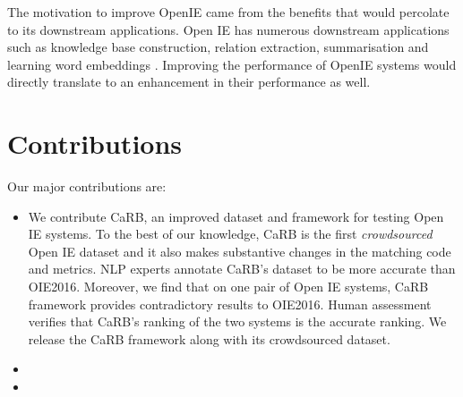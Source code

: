   The motivation to improve OpenIE came from the benefits that would percolate to its downstream applications. Open IE has numerous downstream applications such as knowledge base construction, relation extraction, summarisation and learning word embeddings \citep{embedding,survey}. Improving the performance of OpenIE systems would directly translate to an enhancement in their performance as well.

\section{Contributions}

  Our major contributions are:
  \begin{itemize}
    \item We contribute CaRB, an improved dataset and framework for testing Open IE systems. To the best of our knowledge, CaRB is the first \emph{crowdsourced} Open IE dataset and it also makes substantive changes in the matching code and metrics. NLP experts annotate CaRB's dataset to be more accurate than OIE2016. Moreover, we find that on one  pair of Open IE systems, CaRB framework provides contradictory results to OIE2016. Human assessment verifies that CaRB's ranking of the two systems is the accurate ranking. We release the CaRB framework along with its crowdsourced dataset.
    \item %
    \item %
  \end{itemize}

